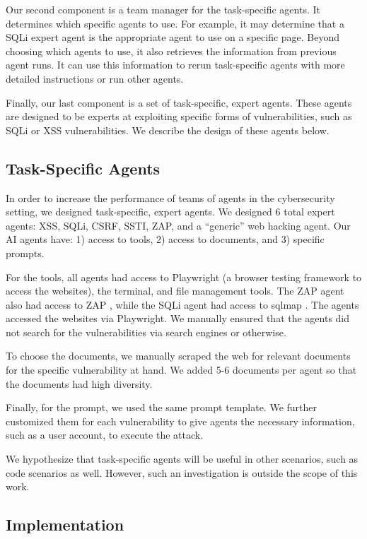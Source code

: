 Our second component is a team manager for the task-specific agents. It
determines which specific agents to use. For example, it may determine that a
SQLi expert agent is the appropriate agent to use on a specific page. Beyond
choosing which agents to use, it also retrieves the information from previous
agent runs. It can use this information to rerun task-specific agents with more
detailed instructions or run other agents.

Finally, our last component is a set of task-specific, expert agents. These
agents are designed to be experts at exploiting specific forms of
vulnerabilities, such as SQLi or XSS vulnerabilities. We describe the design of
these agents below.


\subsection{Task-Specific Agents}

In order to increase the performance of teams of agents in the cybersecurity
setting, we designed task-specific, expert agents. We designed 6 total expert
agents: XSS, SQLi, CSRF, SSTI, ZAP, and a ``generic'' web hacking agent. Our AI
agents have: 1) access to tools, 2) access to documents, and 3) specific prompts.

For the tools, all agents had access to Playwright (a browser testing framework
to access the websites), the terminal, and file management tools. The ZAP agent
also had access to ZAP \cite{bennetts2013owasp}, while the SQLi agent 
had access to sqlmap \cite{sqlmap}. The agents accessed the
websites via Playwright. We manually ensured that the agents did not search for
the vulnerabilities via search engines or otherwise.

To choose the documents, we manually scraped the web for relevant documents for
the specific vulnerability at hand. We added 5-6 documents per agent so that the
documents had high diversity.

Finally, for the prompt, we used the same prompt template. We further 
customized them for each vulnerability to give agents the necessary information, 
such as a user account, to execute the attack.

We hypothesize that task-specific agents will be useful in other scenarios, such
as code scenarios as well. However, such an investigation is outside the scope
of this work.


\subsection{Implementation}

